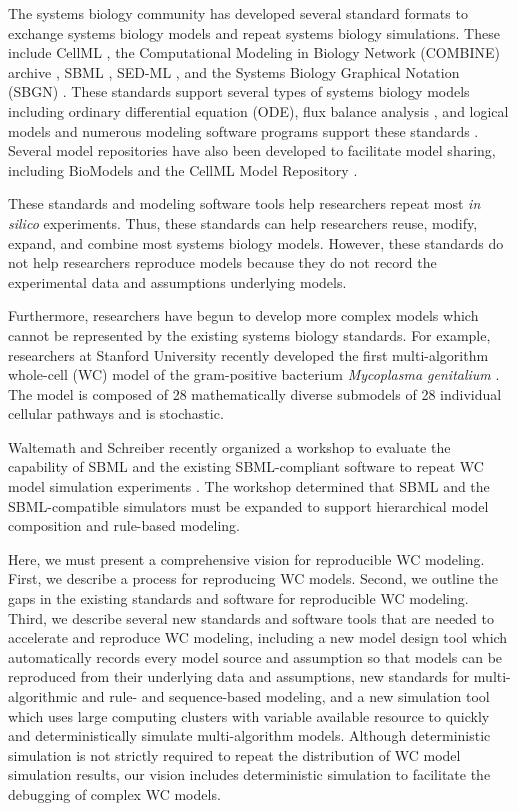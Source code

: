 \documentclass[journal,transmag,twoside]{IEEEtran}
\begin{document}
The systems biology community has developed several standard formats to exchange systems biology models and repeat systems biology simulations. These include CellML \cite{cuellar2003overview}, the Computational Modeling in Biology Network (COMBINE) archive \cite{COMBINE2012}, SBML \cite{hucka2003}, SED-ML \cite{sedml2011}, and the Systems Biology Graphical Notation (SBGN) \cite{LeNovereHMMSS09}. These standards support several types of systems biology models including ordinary differential equation (ODE), flux balance analysis \cite{orth2010flux}, and logical models and numerous modeling software programs support these standards \cite{hucka2011profile}. Several model repositories have also been developed to facilitate model sharing, including BioModels \cite{chelliah2015biomodels} and the CellML Model Repository \cite{lloyd2008cellml}. 

These standards and modeling software tools help researchers repeat most \textit{in silico} experiments. Thus, these standards can help researchers reuse, modify, expand, and combine most systems biology models. However, these standards do not help researchers reproduce models because they do not record the experimental data and assumptions underlying models.

Furthermore, researchers have begun to develop more complex models which cannot be represented by the existing systems biology standards. For example, researchers at Stanford University recently developed the first multi-algorithm whole-cell (WC) model of the gram-positive bacterium \textit{Mycoplasma genitalium} \cite{Karr2012}. The model is composed of 28 mathematically diverse submodels of 28 individual cellular pathways and is stochastic. 

Waltemath and Schreiber recently organized a workshop to evaluate the capability of SBML and the existing SBML-compliant software to repeat WC model simulation experiments \cite{Waltemath2016}. The workshop determined that SBML and the SBML-compatible simulators must be expanded to support hierarchical model composition and rule-based modeling.

Here, we must present a comprehensive vision for reproducible WC modeling. First, we describe a process for reproducing WC models. Second, we outline the gaps in the existing standards and software for reproducible WC modeling. Third, we describe several new standards and software tools that are needed to accelerate and reproduce WC modeling, including a new model design tool which automatically records every model source and assumption so that models can be reproduced from their underlying data and assumptions, new standards for multi-algorithmic and rule- and sequence-based modeling, and a new simulation tool which uses large computing clusters with variable available resource to quickly and deterministically simulate multi-algorithm models. Although deterministic simulation is not strictly required to repeat the distribution of WC model simulation results, our vision includes deterministic simulation to facilitate the debugging of complex WC models. 
\end{document}
